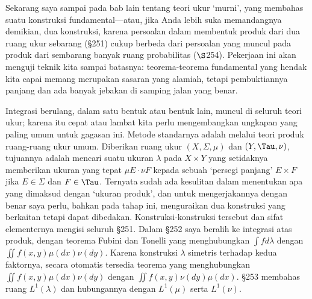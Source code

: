 
\def\chaptername{Ukuran produk}
\def\chaptername{Ukuran produk}

Sekarang saya sampai pada bab lain tentang teori ukur `murni', yang membahas
suatu konstruksi fundamental—atau, jika Anda lebih suka memandangnya demikian,
dua konstruksi, karena persoalan dalam membentuk produk dari dua ruang ukur
sebarang (\S251) cukup berbeda dari persoalan yang muncul pada produk dari
sembarang banyak ruang probabilitas ($\S$254). Pekerjaan ini akan menguji teknik
kita sampai batasnya: teorema-teorema fundamental yang hendak kita capai
memang merupakan sasaran yang alamiah, tetapi pembuktiannya panjang dan ada
banyak jebakan di samping jalan yang benar.


Integrasi berulang, dalam satu bentuk atau bentuk lain, muncul di seluruh
teori ukur; karena itu cepat atau lambat kita perlu mengembangkan ungkapan
yang paling umum untuk gagasan ini. Metode standarnya adalah melalui teori
produk ruang-ruang ukur umum. Diberikan ruang ukur $(X,\Sigma,\mu)$ dan
$(Y,\Tau,\nu)$, tujuannya adalah mencari suatu ukuran $\lambda$ pada
$X\times Y$ yang setidaknya memberikan ukuran yang tepat
$\mu E\cdot\nu F$ kepada sebuah `persegi panjang' $E\times F$ jika
$E\in\Sigma$ dan $F\in\Tau$. Ternyata sudah ada kesulitan dalam menentukan
apa yang dimaksud dengan `ukuran produk', dan untuk mengerjakannya dengan
benar saya perlu, bahkan pada tahap ini, menguraikan dua konstruksi yang
berkaitan tetapi dapat dibedakan. Konstruksi-konstruksi tersebut dan sifat
elementernya mengisi seluruh \S251. Dalam \S252 saya beralih ke integrasi
atas produk, dengan teorema Fubini dan Tonelli yang menghubungkan
$\int fd\lambda$ dengan $\iint f(x,y)\mu(dx)\nu(dy)$. Karena konstruksi
$\lambda$ simetris terhadap kedua faktornya, secara otomatis tersedia teorema
yang menghubungkan $\iint f(x,y)\mu(dx)\nu(dy)$ dengan
$\iint f(x,y)\nu(dy)\mu(dx)$. \S253 membahas ruang $L^1(\lambda)$ dan
hubungannya dengan $L^1(\mu)$ serta $L^1(\nu)$.

